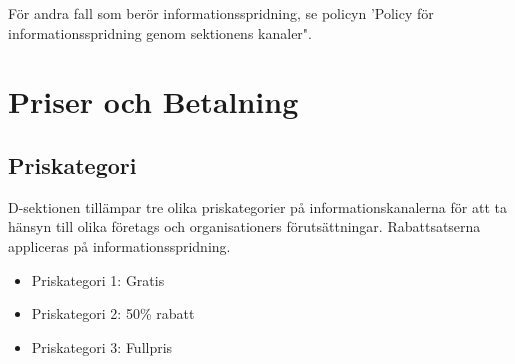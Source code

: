 \documentclass{dsekprotokoll}
\begin{document}
För andra fall som berör informationsspridning, se policyn 'Policy för informationsspridning genom sektionens kanaler".

\section{Priser och Betalning}

\subsection{Priskategori}

D-sektionen tillämpar tre olika priskategorier på informationskanalerna för att ta hänsyn till olika företags och organisationers förutsättningar.
Rabattsatserna appliceras på informationsspridning.

\begin{itemize}
    \item Priskategori 1: Gratis
    \item Priskategori 2: 50\% rabatt
    \item Priskategori 3: Fullpris
\end{itemize}
\end{document}
